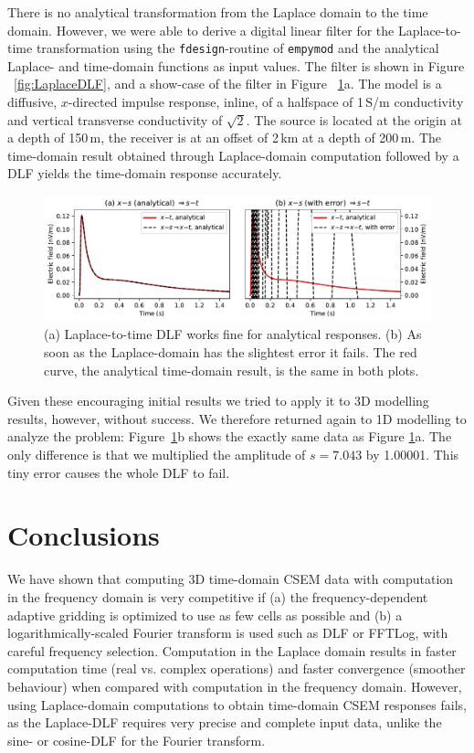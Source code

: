 \documentclass{eage2020}
\newcommand{\empymod}{\texttt{empymod}\xspace}
\begin{document}
There is no analytical transformation from the Laplace domain to the time
domain. However, we were able to derive a digital linear filter for the
Laplace-to-time transformation using the \texttt{fdesign}-routine of \empymod
and the analytical Laplace- and time-domain functions as input values. The
filter is shown in Figure ~\ref{fig:LaplaceDLF}, and a show-case of the filter
in Figure ~\ref{fig:s-t_time}a. The model is a diffusive, $x$-directed impulse
response, inline, of a halfspace of 1\,S/m conductivity and vertical transverse
conductivity of $\sqrt{2}$. The source is located at the origin at a depth of
150\,m, the receiver is at an offset of 2\,km at a depth of 200\,m. The
time-domain result obtained through Laplace-domain computation followed by a
DLF yields the time-domain response accurately.
%
\begin{figure}[tb]
  \centering
  \includegraphics[width=\linewidth]{s-t_time}%
  \caption{(a) Laplace-to-time DLF works fine for analytical responses. (b) As
    soon as the Laplace-domain has the slightest error it fails. The red curve,
    the analytical time-domain result, is the same in both plots.}
  \label{fig:s-t_time}
\end{figure}
%

Given these encouraging initial results we tried to apply it to 3D modelling
results, however, without success. We therefore returned again to 1D modelling
to analyze the problem: Figure~\ref{fig:s-t_time}b shows the exactly same data
as Figure \ref{fig:s-t_time}a. The only difference is that we multiplied the
amplitude of $s=7.043$ by 1.00001. This tiny error causes the whole DLF to
fail.

\section{Conclusions}

We have shown that computing 3D time-domain CSEM data with computation in the
frequency domain is very competitive if (a) the frequency-dependent adaptive
gridding is optimized to use as few cells as possible and (b) a
logarithmically-scaled Fourier transform is used such as DLF or FFTLog, with
careful frequency selection. Computation in the Laplace domain results in
faster computation time (real vs. complex operations) and faster convergence
(smoother behaviour) when compared with computation in the frequency domain.
However, using Laplace-domain computations to obtain time-domain CSEM responses
fails, as the Laplace-DLF requires very precise and complete input data, unlike
the sine- or cosine-DLF for the Fourier transform.
\end{document}
